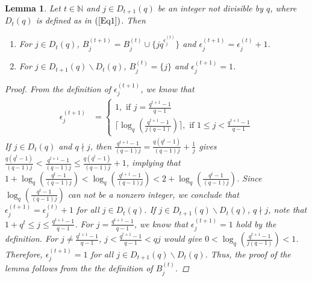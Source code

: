 \documentclass[pdflatex,sn-mathphys-num]{sn-jnl}%
\newtheorem{lemma}{Lemma}
\theoremstyle{thmstyleone}%
\theoremstyle{thmstyletwo}%
\theoremstyle{thmstylethree}%
\begin{document}
\begin{lemma}\label{L1}
    Let $t\in\mathbb{N}$ and $j\in D_{t+1}(q)$ be an integer not divisible by $q$, where $D_{t}(q)$ is defined as in $(\ref{Eq1})$. Then 
    \begin{enumerate}
        \item[$1.$] For $j\in D_{t}(q)$, $B_{j}^{(t+1)}=B_{j}^{(t)}\cup\{jq^{\epsilon_{j}^{(t)}}\}$ and $\epsilon_{j}^{(t+1)}=\epsilon_{j}^{(t)}+1$. 
        \item[$2.$] For $j\in D_{t+1}(q)\backslash D_{t}(q)$, $B_{j}^{(t)}=\{j\}$ and $\epsilon_{j}^{(t+1)}=1$. 
    \end{enumerate}
    \begin{proof}
      From the definition of $\epsilon_{j}^{(t+1)}$, we know that 
      \begin{align*}
          \epsilon_{j}^{(t+1)} &=\begin{cases}
              1, \text{ if }j=\frac{q^{t+1}-1}{q-1} \\
              \Big\lceil\operatorname{log}_{q}\left(\frac{q^{t+1}-1}{j(q-1)}\right)\Big\rceil,\text{ if }1\leq j<\frac{q^{t+1}-1}{q-1}
          \end{cases} 
      \end{align*}
      If $j\in D_{t}(q)$ and $q\nmid j$, then $\frac{q^{t+1}-1}{(q-1)j}=\frac{q(q^t-1)}{(q-1)j}+\frac{1}{j}$ gives $\frac{q(q^t-1)}{(q-1)j}<\frac{q^{t+1}-1}{(q-1)j}\leq \frac{q(q^t-1)}{(q-1)j}+1$, implying that $1+\operatorname{log}_{q}\left(\frac{q^t-1}{(q-1)j}\right)<\operatorname{log}_{q}\left(\frac{q^{t+1}-1}{(q-1)j}\right)<2+\operatorname{log}_{q}\left(\frac{q^t-1}{(q-1)j}\right)$. Since $\operatorname{log}_{q}\left(\frac{q^t-1}{(q-1)j}\right)$ can not be a nonzero integer, we conclude that $\epsilon_{j}^{(t+1)}=\epsilon_{j}^{(t)}+1$ for all $j\in D_{t}(q)$.
      \newline
      If $j\in D_{t+1}(q)\backslash D_{t}(q)$, $q\nmid j$, note that $1+q^t\leq j\leq\frac{q^{t+1}-1}{q-1}$. For $j=\frac{q^{t+1}-1}{q-1}$, we know that $\epsilon_{j}^{(t+1)}=1$ hold by the definition. For $j\neq \frac{q^{t+1}-1}{q-1}$, $j<\frac{q^{t+1}-1}{q-1}<qj$ would give $0<\operatorname{log}_{q}\left(\frac{q^{t+1}-1}{j(q-1)}\right)<1$. Therefore, $\epsilon_{j}^{(t+1)}=1$ for all $j\in D_{t+1}(q)\backslash D_{t}(q)$.
      \vskip 1pt
      Thus, the proof of the lemma follows from the the definition of $B_{j}^{(t)}$.
    \end{proof}
\end{lemma}
\end{document}
